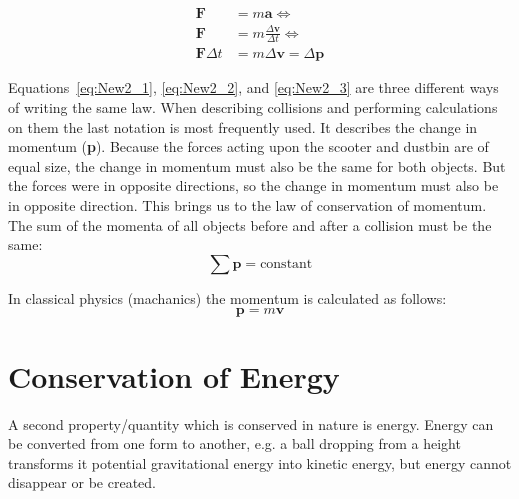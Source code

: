 \begin{align}
\textbf{F} &= m\textbf{a}  \Longleftrightarrow \label{eq:New2_1} \\
\textbf{F} &= m\frac{\Delta \textbf{v}}{\Delta t} \Longleftrightarrow \label{eq:New2_2} \\
\textbf{F} \Delta t &= m\Delta \textbf{v} = \Delta \textbf{p} \label{eq:New2_3}
\end{align}

Equations~\ref{eq:New2_1}, \ref{eq:New2_2}, and \ref{eq:New2_3} are three different ways of writing the same law. When describing collisions and performing calculations on them the last notation is most frequently used. It describes the change in momentum (\textbf{p}). Because the forces acting upon the scooter and dustbin are of equal size, the change in momentum must also be the same for both objects. But the forces were in opposite directions, so the change in momentum must also be in opposite direction. This brings us to the law of conservation of momentum. The sum of the momenta of all objects before and after a collision must be the same:
\begin{equation}
\sum \textbf{p} = \mbox{constant}
\end{equation}

In classical physics (machanics) the momentum is calculated as follows:
\begin{equation}
\textbf{p}=m\textbf{v}
\end{equation}

\section{Conservation of Energy}
A second property/quantity which is conserved in nature is energy. Energy can be converted from one form to another, e.g. a ball dropping from a height transforms it potential gravitational energy into kinetic energy, but energy cannot disappear or be created.

